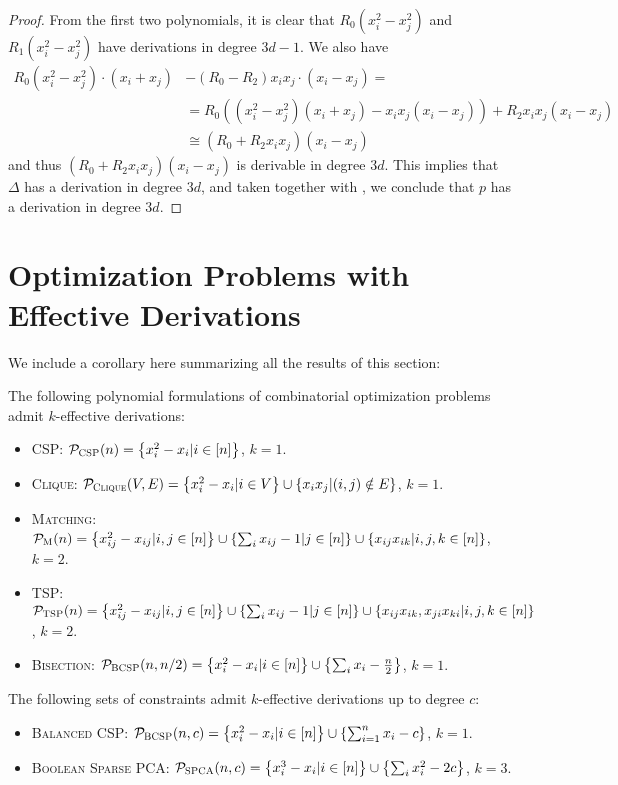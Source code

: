 \begin{proof}
From the first two polynomials, it is clear that $R_0(x_i^2-x_j^2)$ and $R_1(x_i^2-x_j^2)$ have derivations in degree $3d-1$. We also have
\begin{align*}
R_0(x_i^2-x_j^2) \cdot (x_i+x_j) &- (R_0 - R_2)x_ix_j \cdot (x_i - x_j) = \\&= R_0((x_i^2 - x_j^2)(x_i+x_j) - x_ix_j(x_i - x_j)) + R_2x_ix_j(x_i - x_j) \\
&\cong (R_0 + R_2x_ix_j)(x_i - x_j)
\end{align*}
and thus $(R_0 + R_2x_ix_j)(x_i - x_j)$ is derivable in degree $3d$. This implies that $\Delta$ has a derivation in degree $3d$, and taken together with , we conclude that $p$ has a derivation in degree $3d$. 
\end{proof}

\section{Optimization Problems with Effective Derivations}
We include a corollary here summarizing all the results of this section:
\begin{corollary}\label{cor:effective_list}
The following polynomial formulations of combinatorial optimization problems admit $k$-effective derivations:
\begin{itemize}
\item \textsc{CSP}: $\pcsp(n) = \csp$, $k = 1$.
\item \textsc{Clique}: $\pclique(V,E) = \clique$, $k = 1$.
\item \textsc{Matching}: $\pmatch(n) = \matching$, $k = 2$.
\item \textsc{TSP}: $\ptsp(n) = \tsp$, $k = 2$.
\item \textsc{Bisection}: $\pbcsp(n,n/2) = \bisec$, $k = 1$.
\end{itemize}
The following sets of constraints admit $k$-effective derivations up to degree $c$:
\begin{itemize}
\item \textsc{Balanced CSP}: $\pbcsp(n,c) = \bcsp{n}{c}$, $k = 1$.
\item \textsc{Boolean Sparse PCA}: $\pspca(n,c) = \bspca{n}{2c}$, $k = 3$.
\end{itemize}
\end{corollary}
